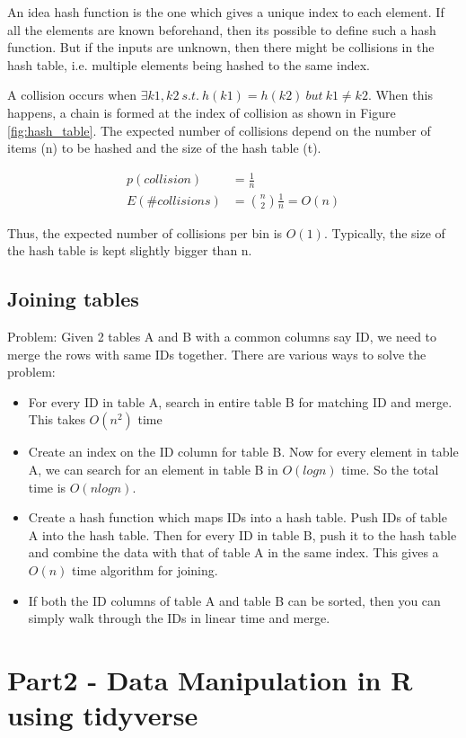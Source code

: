 An idea hash function is the one which gives a unique index to each element. If all the elements are known beforehand, then its possible to define such a hash function. But if the inputs are unknown, then there might be collisions in the hash table, i.e. multiple elements being hashed to the same index.

A collision occurs when $\exists k1,k2\ s.t.\ h(k1)=h(k2)\ but\ k1 \ne k2$. When this happens, a chain is formed at the index of collision as shown in Figure \ref{fig:hash_table}. The expected number of collisions depend on the number of items (n) to be hashed and the size of the hash table (t). 

\begin{align*}
    p(collision) &= \frac{1}{n} \\
    E(\#collisions) &= \binom{n}{2} \frac{1}{n} = O(n)
\end{align*}

Thus, the expected number of collisions per bin is $O(1)$. Typically, the size of the hash table is kept slightly bigger than n.

\subsection{Joining tables}

Problem: Given 2 tables A and B with a common columns say ID, we need to merge the rows with same IDs together. There are various ways to solve the problem:

\begin{itemize}
    \item For every ID in table A, search in entire table B for matching ID and merge. This takes $O(n^2)$ time
    \item Create an index on the ID column for table B. Now for every element in table A, we can search for an element in table B in $O(logn)$ time. So the total time is $O(nlogn)$.
    \item Create a hash function which maps IDs into a hash table. Push IDs of table A into the hash table. Then for every ID in table B, push it to the hash table and combine the data with that of table A in the same index. This gives a $O(n)$ time algorithm for joining.
    \item If both the ID columns of table A and table B can be sorted, then you can simply walk through the IDs in linear time and merge.
\end{itemize}

\section*{Part2 - Data Manipulation in R using tidyverse}

